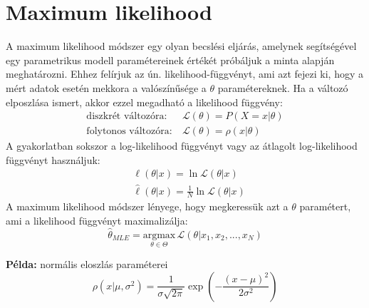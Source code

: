 \documentclass[12pt]{article}
\theoremstyle{plain}
\begin{document}
\section{Maximum likelihood}
A maximum likelihood módszer egy olyan becslési eljárás, amelynek segítségével egy parametrikus modell paramétereinek
értékét próbáljuk a minta alapján meghatározni. Ehhez felírjuk az ún. likelihood-függvényt, ami azt fejezi ki, hogy a 
mért adatok esetén mekkora a valószínűsége a $\theta$ paramétereknek. Ha a változó elposzlása ismert, akkor ezzel 
megadható a likelihood függvény:
\begin{align*}
    \text{diszkrét változóra:} ~ & \mathcal L(\theta) = P(X=x|\theta) \\
    \text{folytonos változóra:} ~ & \mathcal L(\theta) = \rho(x|\theta)
\end{align*}
A gyakorlatban sokszor a log-likelihood függvényt vagy az átlagolt log-likelihood függvényt használjuk:
\begin{align*}
    & \ell(\theta|x) = \ln \mathcal L(\theta|x) \\
    & \hat \ell(\theta|x) = \frac{1}{N}\ln \mathcal L(\theta|x)
\end{align*}
A maximum likelihood módszer lényege, hogy megkeressük azt a $\theta$ paramétert, ami a likelihood függvényt 
maximalizálja:
\begin{equation*}
    \hat\theta_{MLE} = \underset{\theta \in \Theta}{\textrm{argmax}} \,\mathcal L(\theta|x_1, x_2, ..., x_N)
\end{equation*}

\textbf{Példa:} normális eloszlás paraméterei\\
\begin{equation*}
    \rho(x|\mu, \sigma^2) = \frac{1}{\sigma\sqrt{2\pi}}\exp\left(-\frac{(x-\mu)^2}{2\sigma^2}\right)
\end{equation*}
\end{document}
